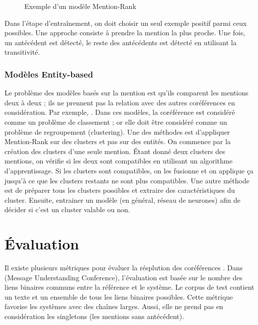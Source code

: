 \documentclass{KodeBook}
\begin{document}
\begin{figure}[ht]
	\centering
	\caption{Exemple d'un modèle Mention-Rank \cite{2019-jurafsky-martin}}
	\label{fig:mention-rank-exp}
\end{figure}

Dans l'étape d'entraînement, on doit choisir un seul exemple positif parmi ceux possibles. 
Une approche consiste à prendre la mention la plus proche.
Une fois, un antécédent est détecté, le reste des antécédents est détecté en utilisant la transitivité. 

\subsubsection{Modèles Entity-based}

Le problème des modèles basés sur la mention est qu'ils comparent les mentions deux à deux ; ils ne prennent pas la relation avec des autres coréférences en considération.
Par exemple, .
Dans ces modèles, la coréférence est considéré comme un problème de classement ; or elle doit être considéré comme un problème de regroupement (clustering). 
Une des méthodes est d'appliquer Mention-Rank sur des clusters et pas sur des entités. 
On commence par la création des clusters d'une seule mention. 
Étant donné deux clusters des mentions, on vérifie si les deux sont compatibles en utilisant un algorithme d'apprentissage.
Si les clusters sont compatibles, on les fusionne et on applique ça jusqu'à ce que les clusters restants ne sont plus compatibles.
Une autre méthode est de préparer tous les clusters possibles et extraire des caractéristiques du cluster.
Ensuite, entrainer un modèle (en général, réseau de neurones) afin de décider si c'est un cluster valable ou non.

\section{Évaluation}

Il existe plusieurs métriques pour évaluer la résplution des coréférences \cite{2016-moosavi-strube}.
Dans  (Message Understanding Conference), l'évaluation est basée sur le nombre des liens binaires communs entre la référence et le système.
Le corpus de test contient un texte et un ensemble de tous les liens binaires possibles. 
Cette métrique favorise les systèmes avec des chaînes larges. 
Aussi, elle ne prend pas en considération les singletons (les mentions sans antécédent).
\end{document}
